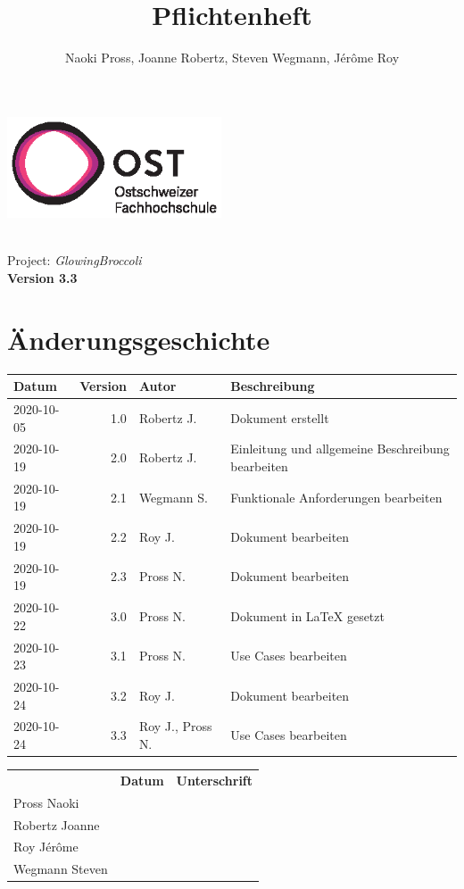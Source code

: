 \documentclass[a4paper, twosided, 11pt]{scrartcl}
\title{Pflichtenheft}
\author{Naoki Pross, Joanne Robertz, Steven Wegmann, J\'er\^ome Roy}
\begin{document}
\begin{titlepage}
  \includegraphics[height=3cm]{pic/ost-logo}
  \begin{flushright}
    \vspace{5cm}
    {\Huge \bfseries \thetitle} \\
    \vspace{5mm}
    {\LARGE Project: \textit{GlowingBroccoli}} \\
    \vspace{5mm}
    {\LARGE \bfseries Version 3.3}
  \end{flushright}
\end{titlepage}


\clearpage
\section*{\"Anderungsgeschichte}
\begin{tabularx}{\textwidth}{lrlX}
  \toprule
  \bfseries Datum & \bfseries Version & \bfseries Autor & \bfseries Beschreibung \\
  \midrule
  2020-10-05 & 1.0 & Robertz J. & Dokument erstellt \\
  2020-10-19 & 2.0 & Robertz J. & Einleitung und allgemeine Beschreibung bearbeiten \\
  2020-10-19 & 2.1 & Wegmann S. & Funktionale Anforderungen bearbeiten \\
  2020-10-19 & 2.2 & Roy J.     & Dokument bearbeiten \\
  2020-10-19 & 2.3 & Pross N.   & Dokument bearbeiten \\
  2020-10-22 & 3.0 & Pross N.   & Dokument in \textrm{\LaTeX} gesetzt \\
  2020-10-23 & 3.1 & Pross N.   & Use Cases bearbeiten \\
  2020-10-24 & 3.2 & Roy J.     & Dokument bearbeiten \\
  2020-10-24 & 3.3 & Roy J., Pross N.     & Use Cases bearbeiten \\
  \bottomrule
\end{tabularx}

\vfill
{
  \renewcommand{\arraystretch}{2}
  \begin{tabularx}{\textwidth}{lp{}X}
                   & \bfseries Datum & \bfseries Unterschrift \\
    Pross Naoki    & \hrulefill & \hrulefill \\
    Robertz Joanne & \hrulefill & \hrulefill \\
    Roy J\'er\^ome & \hrulefill & \hrulefill \\
    Wegmann Steven & \hrulefill & \hrulefill \\
  \end{tabularx}
}
\end{document}
